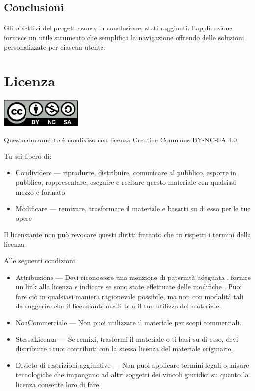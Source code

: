 \documentclass{report}
\begin{document}
\section{Conclusioni}
Gli obiettivi del progetto sono, in conclusione, stati raggiunti: l'applicazione fornisce un utile strumento che semplifica la navigazione offrendo delle soluzioni personalizzate per ciascun utente.

\chapter{Licenza}
\includegraphics[width=4cm]{images/licenza.png}

Questo documento è condiviso con licenza Creative Commons BY-NC-SA 4.0.

Tu sei libero di:
\begin{itemize}
    \item Condividere — riprodurre, distribuire, comunicare al pubblico, esporre in pubblico, rappresentare, eseguire e recitare questo materiale con qualsiasi mezzo e formato
    \item Modificare — remixare, trasformare il materiale e basarti su di esso per le tue opere
\end{itemize}
Il licenziante non può revocare questi diritti fintanto che tu rispetti i termini della licenza.

Alle seguenti condizioni:
\begin{itemize}
    \item Attribuzione — Devi riconoscere una menzione di paternità adeguata , fornire un link alla licenza e indicare se sono state effettuate delle modifiche . Puoi fare ciò in qualsiasi maniera ragionevole possibile, ma non con modalità tali da suggerire che il licenziante avalli te o il tuo utilizzo del materiale.
    \item NonCommerciale — Non puoi utilizzare il materiale per scopi commerciali.
    \item StessaLicenza — Se remixi, trasformi il materiale o ti basi su di esso, devi distribuire i tuoi contributi con la stessa licenza del materiale originario.
    \item Divieto di restrizioni aggiuntive — Non puoi applicare termini legali o misure tecnologiche che impongano ad altri soggetti dei vincoli giuridici su quanto la licenza consente loro di fare.
\end{itemize}
\end{document}
